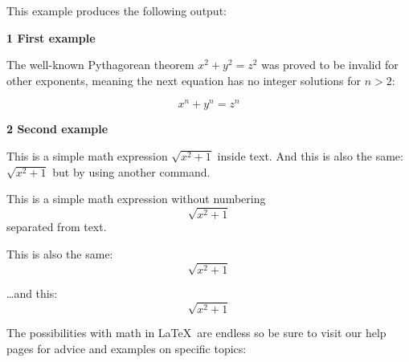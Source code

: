 This example produces the following output:

\begin{mdframed}
    \-\hspace{20pt}\textbf{\Large 1  First example}
    
    \-\hspace{20pt}The well-known Pythagorean theorem \(x^2 + y^2 = z^2\) was proved to be invalid for other exponents, meaning the next equation has no integer solutions for \(n>2\):

    \[ x^n + y^n = z^n \]

    \-\hspace{20pt}\textbf{\Large 2  Second example}

    \-\hspace{20pt}This is a simple math expression \(\sqrt{x^2+1}\) inside text. 
    And this is also the same: 
    \begin{math}
    \sqrt{x^2+1}
    \end{math}
    but by using another command.

    \-\hspace{20pt}This is a simple math expression without numbering
    \[\sqrt{x^2+1}\] 
    separated from text.

    \-\hspace{20pt}This is also the same:
    \begin{displaymath}
    \sqrt{x^2+1}
    \end{displaymath}

    \ldots and this:
    \begin{equation*}
    \sqrt{x^2+1}
    \end{equation*} 
\end{mdframed}

The possibilities with math in \LaTeX\ are endless so be sure to visit our help pages for advice and examples on specific topics:

